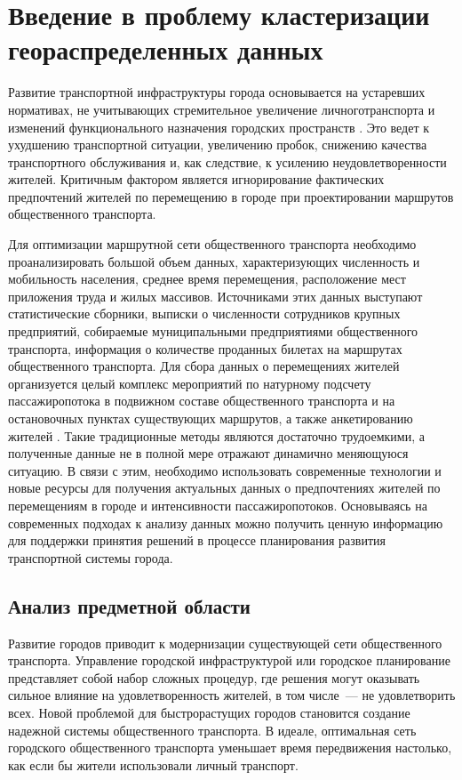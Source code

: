 \chapter{Введение в проблему кластеризации геораспределенных данных}

Развитие транспортной инфраструктуры города основывается на устаревших нормативах, не учитывающих стремительное увеличение личного\linebreak транспорта и изменений функционального назначения городских пространств \cite{bib:1}. Это ведет к ухудшению транспортной ситуации, увеличению пробок, снижению качества транспортного обслуживания и, как следствие, к усилению неудовлетворенности жителей. Критичным фактором является игнорирование фактических предпочтений жителей по перемещению в городе при проектировании маршрутов общественного транспорта.

Для оптимизации маршрутной сети общественного транспорта необходимо проанализировать большой объем данных, характеризующих численность и мобильность населения, среднее время перемещения, расположение мест приложения труда и жилых массивов. Источниками этих данных выступают статистические сборники, выписки о численности сотрудников крупных предприятий, собираемые муниципальными предприятиями общественного транспорта, информация о количестве проданных билетах на маршрутах общественного транспорта. Для сбора данных о перемещениях жителей организуется целый комплекс мероприятий по натурному подсчету пассажиропотока в подвижном составе общественного транспорта и на остановочных пунктах существующих маршрутов, а также анкетированию жителей \cite{bib:2, bib:3}. Такие традиционные методы являются достаточно трудоемкими, а полученные данные не в полной мере отражают динамично меняющуюся ситуацию. В связи с этим, необходимо использовать современные технологии и новые ресурсы для получения актуальных данных о предпочтениях жителей по перемещениям в городе и интенсивности пассажиропотоков. Основываясь на современных подходах к анализу данных можно получить ценную информацию для поддержки принятия решений в процессе планирования развития транспортной системы города.

\section{Анализ предметной области}
Развитие городов приводит к модернизации существующей сети общественного транспорта. Управление городской инфраструктурой или городское планирование представляет собой набор сложных процедур, где решения могут оказывать сильное влияние на удовлетворенность жителей, в том числе~--- не удовлетворить всех. Новой проблемой для быстрорастущих городов становится создание надежной системы общественного транспорта. В идеале, оптимальная сеть городского общественного транспорта уменьшает время передвижения настолько, как если бы жители использовали личный транспорт.


